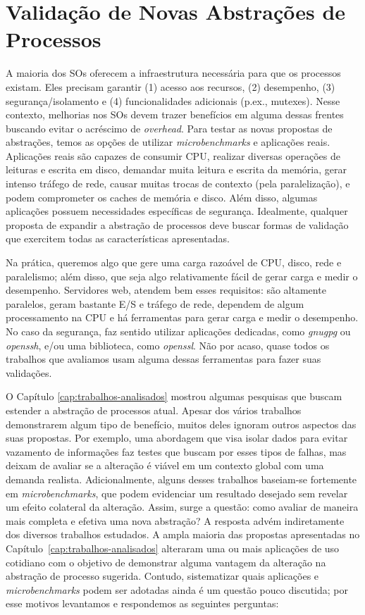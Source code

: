 \chapter{Validação de Novas Abstrações de Processos}
\label{cap:validacoes}

A maioria dos SOs oferecem a infraestrutura necessária para que os processos
existam. Eles precisam garantir (1) acesso aos recursos, (2) desempenho, (3)
segurança/isolamento e (4) funcionalidades adicionais (p.ex., mutexes).  Nesse
contexto, melhorias nos SOs devem trazer benefícios em alguma dessas frentes
buscando evitar o acréscimo de \emph{overhead}. Para testar as novas propostas de
abstrações, temos as opções de utilizar \emph{microbenchmarks} e aplicações
reais.  Aplicações reais são capazes de consumir CPU, realizar diversas
operações de leituras e escrita em disco, demandar muita leitura e escrita da
memória, gerar intenso tráfego de rede, causar muitas trocas de contexto (pela
paralelização), e podem comprometer os caches de memória e disco. Além disso,
algumas aplicações possuem necessidades específicas de segurança. Idealmente,
qualquer proposta de expandir a abstração de processos deve buscar formas de
validação que exercitem todas as características apresentadas.

Na prática, queremos algo que gere uma carga razoável de CPU, disco, rede e
paralelismo; além disso, que seja algo relativamente fácil de gerar carga e
medir o desempenho. Servidores web, atendem bem esses requisitos: são altamente
paralelos, geram bastante E/S e tráfego de rede, dependem de algum
processamento na CPU e há ferramentas para gerar carga e medir o desempenho. No
caso da segurança, faz sentido utilizar aplicações dedicadas, como
\emph{gnugpg} ou \emph{openssh}, e/ou uma biblioteca, como \emph{openssl}. Não
por acaso, quase todos os trabalhos que avaliamos usam alguma dessas
ferramentas para fazer suas validações.

O Capítulo \ref{cap:trabalhos-analisados} mostrou algumas pesquisas que buscam
estender a abstração de processos atual. Apesar dos vários trabalhos
demonstrarem algum tipo de benefício, muitos deles ignoram outros aspectos das
suas propostas. Por exemplo, uma abordagem que visa isolar dados para evitar
vazamento de informações faz testes que buscam por esses tipos de falhas, mas
deixam de avaliar se a alteração é viável em um contexto global com uma
demanda realista. Adicionalmente, alguns desses trabalhos baseiam-se
fortemente em \emph{microbenchmarks}, que podem evidenciar um resultado
desejado sem revelar um efeito colateral da alteração. Assim, surge a questão:
como avaliar de maneira mais completa e efetiva uma nova abstração? A resposta
advém indiretamente dos diversos trabalhos estudados. A ampla maioria das
propostas apresentadas no Capítulo~\ref{cap:trabalhos-analisados} alteraram uma
ou mais aplicações de uso cotidiano com o objetivo de demonstrar alguma
vantagem da alteração na abstração de processo sugerida. Contudo, sistematizar
quais aplicações e \emph{microbenchmarks} podem ser adotadas ainda é um questão
pouco discutida; por esse motivos levantamos e respondemos as seguintes
perguntas:

